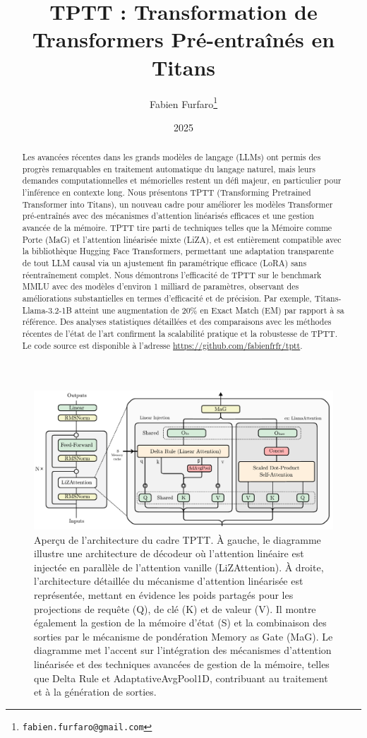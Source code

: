 \documentclass[10pt,a4paper]{article}
\title{\Large\textbf{TPTT : Transformation de Transformers Pré-entraînés en Titans}}
\author{\large Fabien Furfaro\thanks{\texttt{fabien.furfaro@gmail.com}}}
\date{\large 2025}
\begin{document}
\maketitle

\begin{abstract}
Les avancées récentes dans les grands modèles de langage (LLMs) ont permis des progrès remarquables en traitement automatique du langage naturel, mais leurs demandes computationnelles et mémorielles restent un défi majeur, en particulier pour l'inférence en contexte long. Nous présentons TPTT (Transforming Pretrained Transformer into Titans), un nouveau cadre pour améliorer les modèles Transformer pré-entraînés avec des mécanismes d'attention linéarisés efficaces et une gestion avancée de la mémoire. TPTT tire parti de techniques telles que la Mémoire comme Porte (MaG) et l'attention linéarisée mixte (LiZA), et est entièrement compatible avec la bibliothèque Hugging Face Transformers, permettant une adaptation transparente de tout LLM causal via un ajustement fin paramétrique efficace (LoRA) sans réentraînement complet. Nous démontrons l'efficacité de TPTT sur le benchmark MMLU avec des modèles d'environ 1 milliard de paramètres, observant des améliorations substantielles en termes d'efficacité et de précision. Par exemple, Titans-Llama-3.2-1B atteint une augmentation de 20\% en Exact Match (EM) par rapport à sa référence. Des analyses statistiques détaillées et des comparaisons avec les méthodes récentes de l'état de l'art confirment la scalabilité pratique et la robustesse de TPTT. Le code source est disponible à l'adresse \url{https://github.com/fabienfrfr/tptt}.
\end{abstract}

\begin{figure}[ht]
    \centering
    \includegraphics[width=0.8\linewidth]{fig.pdf}
    \caption{Aperçu de l'architecture du cadre TPTT. À gauche, le diagramme illustre une architecture de décodeur où l'attention linéaire est injectée en parallèle de l'attention vanille (LiZAttention). À droite, l'architecture détaillée du mécanisme d'attention linéarisée est représentée, mettant en évidence les poids partagés pour les projections de requête (Q), de clé (K) et de valeur (V). Il montre également la gestion de la mémoire d'état (S) et la combinaison des sorties par le mécanisme de pondération Memory as Gate (MaG). Le diagramme met l'accent sur l'intégration des mécanismes d'attention linéarisée et des techniques avancées de gestion de la mémoire, telles que Delta Rule et AdaptativeAvgPool1D, contribuant au traitement et à la génération de sorties.}
    \label{fig:approach_overview}
\end{figure}
\end{document}
